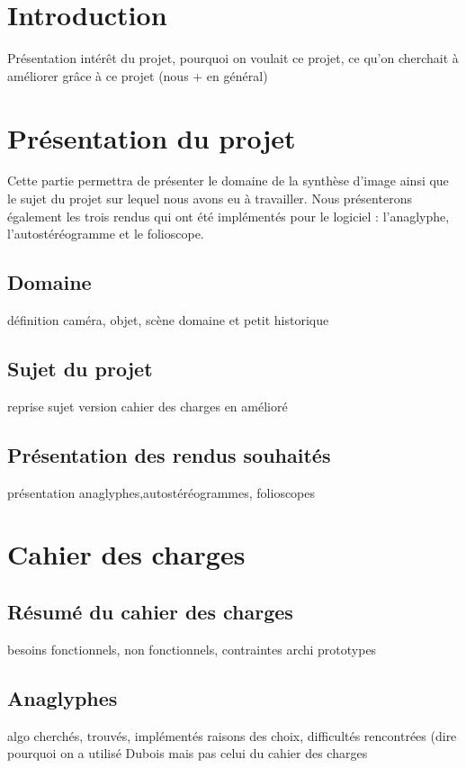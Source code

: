 \documentclass[paper=a4, fontsize=11pt]{article}
\newenvironment{changemargin}[2]{\begin{list}{}{%
      \setlength{\topsep}{0pt}%
      \setlength{\leftmargin}{0pt}%
      \setlength{\rightmargin}{0pt}%
      \setlength{\listparindent}{\parindent}%
      \setlength{\itemindent}{\parindent}%
      \setlength{\parsep}{0pt plus 1pt}%
      \addtolength{\leftmargin}{#1}%
      \addtolength{\rightmargin}{#2}%
    }\item }{\end{list}}
\numberwithin{equation}{section}		%
\numberwithin{figure}{section}			%
\numberwithin{table}{section}				%
\begin{document}
\begin{changemargin}{-1cm}{-1cm}

  \section{Introduction}
  
  Présentation intérêt du projet, pourquoi on voulait ce projet, ce qu'on cherchait à améliorer grâce à ce projet (nous + en général)
  
  \section{Présentation du projet}
  Cette partie permettra de présenter le domaine de la synthèse d'image ainsi que le sujet du projet sur lequel nous avons eu à travailler. Nous présenterons également les trois rendus qui ont été implémentés pour le logiciel : l'anaglyphe, l'autostéréogramme et le folioscope.
  \subsection{Domaine}
  
  définition caméra, objet, scène
  domaine et petit historique
  \subsection{Sujet du projet}
  
  reprise sujet version cahier des charges en amélioré
  \subsection{Présentation des rendus souhaités}
  
  présentation anaglyphes,autostéréogrammes, folioscopes

  \section{Cahier des charges}
  \subsection{Résumé du cahier des charges}
  
  besoins fonctionnels, non fonctionnels, contraintes
  archi
  prototypes
  \subsection{Anaglyphes}
  
  algo cherchés, trouvés, implémentés
  raisons des choix, difficultés rencontrées
  (dire pourquoi on a utilisé Dubois mais pas celui du cahier des charges

\end{changemargin}
\end{document}
